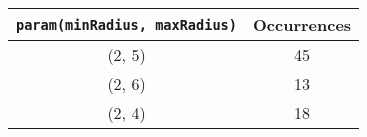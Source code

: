 \documentclass[letterpaper, 12pt]{article}
\begin{document}
\begin{longtable}{|c|c|}
\hline
\textbf{\texttt{param(minRadius, maxRadius)}} & \textbf{Occurrences} \\
\hline
(2, 5) & 45 \\
\hline
(2, 6) & 13 \\
\hline
(2, 4) & 18 \\
\hline
\end{longtable}
\end{document}
